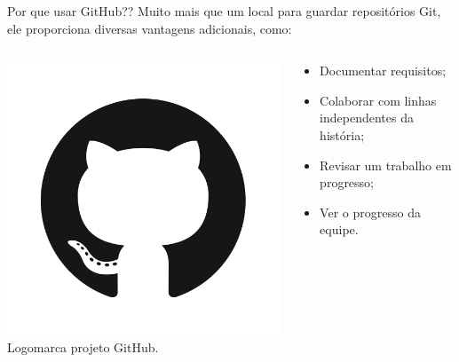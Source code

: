 \documentclass{beamer}
\begin{document}
\begin{frame}{Por que usar GitHub??}
   Muito mais que um local para guardar repositórios Git, ele proporciona 
diversas vantagens adicionais, como:
  \begin{columns}
    \begin{column}{0.3\textwidth}
       \includegraphics[height=0.4\paperheight]{github_logo.png} \\
       \tiny{Logomarca projeto GitHub}.
    \end{column}
    \begin{column}{0.5\textwidth}
      \begin{itemize}
        \item Documentar requisitos;
	 \item Colaborar com linhas independentes da história;
	 \item Revisar um trabalho em progresso;
	 \item Ver o progresso da equipe.
      \end{itemize} 
    \end{column}    
  \end{columns}
\end{frame}
\end{document}
